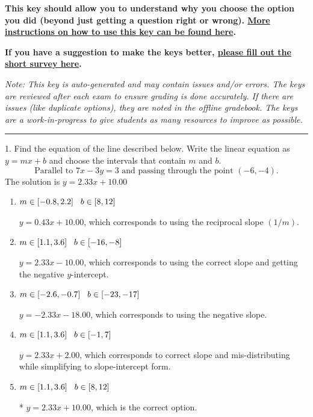 \documentclass{extbook}[14pt]
\begin{document}
\textbf{This key should allow you to understand why you choose the option you did (beyond just getting a question right or wrong). \href{https://xronos.clas.ufl.edu/mac1105spring2020/courseDescriptionAndMisc/Exams/LearningFromResults}{More instructions on how to use this key can be found here}.}

\textbf{If you have a suggestion to make the keys better, \href{https://forms.gle/CZkbZmPbC9XALEE88}{please fill out the short survey here}.}

\textit{Note: This key is auto-generated and may contain issues and/or errors. The keys are reviewed after each exam to ensure grading is done accurately. If there are issues (like duplicate options), they are noted in the offline gradebook. The keys are a work-in-progress to give students as many resources to improve as possible.}

\rule{\textwidth}{0.4pt}

1. Find the equation of the line described below. Write the linear equation as $ y=mx+b $ and choose the intervals that contain $m$ and $b$.
\[ \text{Parallel to } 7 x - 3 y = 3 \text{ and passing through the point } (-6, -4). \] 
The solution is $ y = 2.33x + 10.00 $ 

\begin{enumerate}[label=\Alph*.] 
\item $ m \in [-0.8, 2.2] \hspace*{3mm} b \in [8, 12] $ 

  $y = 0.43x + 10.00$, which corresponds to using the reciprocal slope $(1/m)$. 
\item $ m \in [1.1, 3.6] \hspace*{3mm} b \in [-16, -8] $ 

  $y = 2.33x - 10.00$, which corresponds to using the correct slope and getting the negative $y$-intercept. 
\item $ m \in [-2.6, -0.7] \hspace*{3mm} b \in [-23, -17] $ 

  $y = -2.33x - 18.00$, which corresponds to using the negative slope. 
\item $ m \in [1.1, 3.6] \hspace*{3mm} b \in [-1, 7] $ 

  $y = 2.33x + 2.00$, which corresponds to correct slope and mis-distributing while simplifying to slope-intercept form. 
\item $ m \in [1.1, 3.6] \hspace*{3mm} b \in [8, 12] $ 

 * $y = 2.33x + 10.00$, which is the correct option. 
\end{enumerate} 
 
\end{document}
